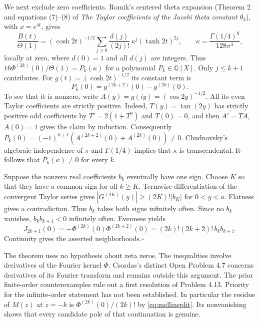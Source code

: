 \documentclass[11pt,a4paper]{article}
\begin{document}
We next exclude zero coefficients. Romik's centered theta expansion \cite{romik}
(Theorem 2 and equations (7)--(8) of \emph{The Taylor coefficients of
the Jacobi theta constant $\theta_3$}), with $x=e^{4t}$, gives
\[
 \frac{B(t)}{\Theta(1)}=
 (\cosh 2t)^{-1/2}
 \sum_{j\ge0}\frac{d(j)}{(2j)!}\,\kappa^j(\tanh 2t)^{2j},\qquad
 \kappa=\frac{\Gamma(1/4)^8}{128\pi^4},
\]
locally at zero, where $d(0)=1$ and all $d(j)$ are integers. Thus
$16\Phi^{(2k)}(0)/\Theta(1)=P_k(\kappa)$ for a polynomial
$P_k\in\mathbb Q[X]$. Only $j\le k+1$ contributes. For
$g(t)=(\cosh 2t)^{-1/2}$ its constant term is
\[
 P_k(0)=g^{(2k+2)}(0)-g^{(2k)}(0).
\]
To see that it is nonzero, write $A(y)=g(iy)=(\cos 2y)^{-1/2}$.
All its even Taylor coefficients are strictly positive. Indeed,
$T(y)=\tan(2y)$ has strictly positive odd coefficients by
$T'=2(1+T^2)$ and $T(0)=0$, and then $A'=TA$, $A(0)=1$ gives the claim
by induction. Consequently $P_k(0)=(-1)^{k+1}
(A^{(2k+2)}(0)+A^{(2k)}(0))\ne0$. Chudnovsky's algebraic
independence \cite[p.~399]{roy} of $\pi$ and $\Gamma(1/4)$ implies that $\kappa$ is
transcendental. It follows that $P_k(\kappa)\ne0$ for every $k$.

Suppose the nonzero real coefficients $b_k$ eventually have one sign.
Choose $K$ so that they have a common sign for all $k\ge K$.
Termwise differentiation of the convergent Taylor series gives
$|G^{(2K)}(y)|\ge (2K)!|b_K|$ for $0<y<a$. Flatness gives a
contradiction. Thus $b_k$ takes both signs infinitely often. Since
no $b_k$ vanishes, $b_kb_{k+1}<0$ infinitely often. Evenness yields
\[
 J_{2k+1}(0)=-\Phi^{(2k)}(0)\Phi^{(2k+2)}(0)
 =(2k)!(2k+2)!\, b_kb_{k+1}.
\]
Continuity gives the asserted neighborhoods.\hfill$\square$

\medskip\noindent
The theorem uses no hypothesis about zeta zeros. The inequalities involve
derivatives of the Fourier kernel $\Phi$. Csordas's distinct Open Problem
4.7 concerns derivatives of its Fourier transform and remains outside this
argument. The prior finite-order counterexamples rule out a first
resolution of Problem 4.13. Priority for the infinite-order statement
has not been established.
In particular the residue of $M(z)$ at $z=-k$ is
$\Phi^{(2k)}(0)/(2k)!$ by \eqref{eq:mellinsplit}. Its nonvanishing shows
that every candidate pole of that continuation is genuine.
\end{document}

